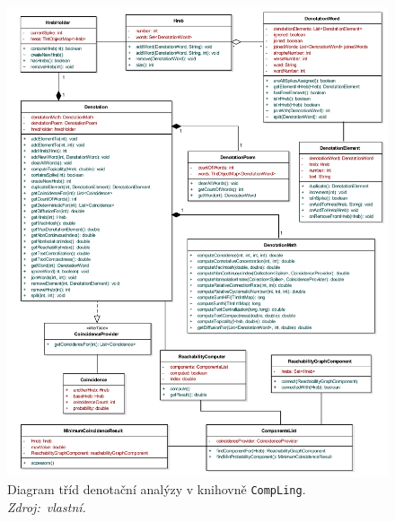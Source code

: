 \documentclass[dp.tex]{subfiles}
\begin{document}
\newpage
\begin{figure}[H]
	\centering
	\includegraphics[max width=\textwidth,keepaspectratio=true]{imgs-60-aplikace/compLing-denotation-class-diagram}
	\caption[]{Diagram tříd denotační analýzy v knihovně \texttt{CompLing}. \textit{Zdroj:~vlastní.}}
	\label{fig:compling-denotation-class-diagram}
\end{figure}
\end{document}
